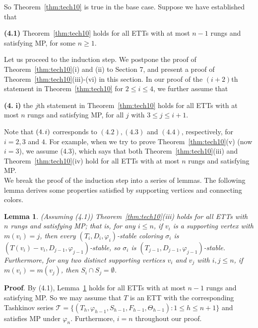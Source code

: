 \documentclass[11pt]{article}
\newtheorem{lemma}[theorem]{Lemma}
\newcommand{\TT}{\mathcal {T}}
\newcommand{\phiv}{\varphi}
\begin{document}
\vskip 3mm

So Theorem~\ref{thm:tech10} is true in the base case. Suppose we have established that 

{\bf (4.1)} Theorem~\ref{thm:tech10} holds for all ETTs with at most $n-1$ rungs and satisfying MP, for some $n\ge 1$.

Let us proceed to the induction step. We postpone the proof of Theorem~\ref{thm:tech10}(i) and (ii) to 
Section 7, and present a proof of Theorem~\ref{thm:tech10}(iii)-(vi) in this section. In our proof of the $(i+2)$th 
statement in Theorem~\ref{thm:tech10} for $2\le i \le 4$, we further assume that

{\bf (4.} \hskip -2.8mm ${\bm i}${\bf )} the $j$th statement in \hskip 0.5mm Theorem~\ref{thm:tech10} \hskip 0.5mm holds for all ETTs with at most $n$ rungs and 
satisfying MP, for all $j$ with $3\le j \le i+1$.

Note that $(4. \hskip 0.4mmi)$ corresponds to $(4.2), (4.3)$ and $(4.4)$, respectively, for $i=2,3$ and $4$. 
For example, when we try to prove Theorem~\ref{thm:tech10}(v) (now $i=3$), we assume (4.3), which says that 
both Theorem~\ref{thm:tech10}(iii) and Theorem~\ref{thm:tech10}(iv) hold for all ETTs with at most $n$ rungs and satisfying MP. \\

We break the proof of the induction step into a series of lemmas. The following lemma derives some properties satisfied
by supporting vertices and connecting colors.

\begin{lemma}\label{extension rules}
(Assuming (4.1)) Theorem~\ref{thm:tech10}(iii) holds for all ETTs with $n$ rungs and satisfying MP; that is, 
for any $i \le n$,  if $v_i$ is a supporting vertex with $m(v_i) =j$, then every $(T_i, D_i, \varphi_i)$-stable 
coloring $\sigma_i$ is $(T(v_i)-v_i, D_{j-1},\varphi_{j-1})$-stable, so $\sigma_i$ is $(T_{j-1},D_{j-1},\varphi_{j-1})$-stable. 
Furthermore, for any two distinct supporting vertices $v_i$ and $v_j$ with $i,j \le n$, if $m(v_i)=m(v_j)$, then $S_i \cap S_j=\emptyset$.
\end{lemma}	

{\bf Proof}. By (4.1), Lemma~\ref{extension rules} holds for all ETTs with at most $n-1$ rungs and satisfying MP. So we may assume that
$T$ is an ETT with the corresponding Tashkinov series $\TT=\{(T_h, \phiv_{h-1}, S_{h-1}, F_{h-1}, \Theta_{h-1}): 1\le h \le n+1\}$ 
and satisfies MP under $\varphi_n$. Furthermore, $i = n$ throughout our proof.
\end{document}
